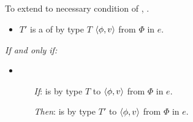 \subsection{}
\label{sec:rotoc}

\begin{note}
  To extend \ptC{} to necessary condition of \tC{}, \rotoc{}.
\end{note}

\begin{note}
  \begin{definition}[A \rotoc{}]
    \label{def:rotoc}
    \newline

    \begin{itemize}
    \item
      \(T'\) is a \emph{\tRep{}} of \vAgent{} \tC{} by type \(T\) \(\langle \phi, v \rangle\) from \(\Phi\) in \(e\).
    \end{itemize}

    \emph{If and only if:}

    \begin{itemize}
    \item
      \begin{itemize}
      \item[\emph{If}:]
        \vAgent{} is \tCV{} by type \(T\) to \(\langle \phi, v \rangle\) from \(\Phi\) in \(e\).
      \item[\emph{Then}:]
        \vAgent{} is \ptCV{} by type \(T'\) to \(\langle \phi, v \rangle\) from \(\Phi\) in \(e\).
      \end{itemize}
    \end{itemize}
    \vspace{-\baselineskip}
  \end{definition}


\end{note}
